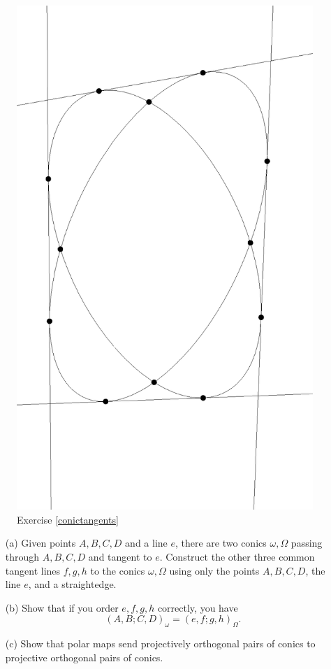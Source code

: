 \begin{figure}[!htb]
\centering
\includegraphics[scale=0.4,angle=270]{conictangents.eps}
\caption{Exercise \ref{conictangents}}
\end{figure}

\begin{exer}\label{conictangents}\hspace{2em}
\begin{itemize}
\item[(a)] Given points $A,B,C,D$ and a line $e$, there are two conics $\omega,\Omega$ passing through $A,B,C,D$ and tangent to $e$. Construct the other three common tangent lines $f,g,h$ to the conics $\omega,\Omega$ using only the points $A,B,C,D$, the line $e$, and a straightedge.

\item[(b)] Show that if you order $e,f,g,h$ correctly, you have
\[
(A,B;C,D)_\omega = (e,f;g,h)_\Omega.
\]

\item[(c)] Show that polar maps send projectively orthogonal pairs of conics to projective orthogonal pairs of conics.
\end{itemize}
\end{exer}

